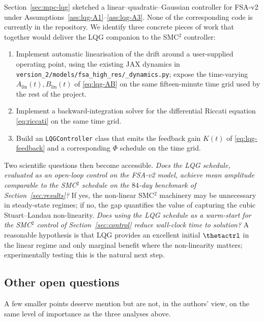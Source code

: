 Section~\ref{sec:mpc-lqg} sketched a linear--quadratic--Gaussian
controller for FSA-v2 under Assumptions~\ref{ass:lqg-A1}--\ref{ass:lqg-A3}.
None of the corresponding code is currently in the repository. We
identify three concrete pieces of work that together would deliver the
LQG companion to the SMC${}^2$ controller:
\begin{enumerate}
  \item Implement automatic linearisation of the drift around a
        user-supplied operating point, using the existing JAX dynamics in
        \texttt{version\_2/models/fsa\_high\_res/\_dynamics.py}; expose
        the time-varying $A_{\mathrm{lin}}(t),B_{\mathrm{lin}}(t)$ of
        \eqref{eq:lqg-AB} on the same fifteen-minute time grid used by
        the rest of the project.
  \item Implement a backward-integration solver for the differential
        Riccati equation \eqref{eq:riccati} on the same time grid.
  \item Build an \texttt{LQGController} class that emits the feedback
        gain $K(t)$ of \eqref{eq:lqg-feedback} and a corresponding
        $\Phi$ schedule on the time grid.
\end{enumerate}
Two scientific questions then become accessible. \emph{Does the LQG
schedule, evaluated as an open-loop control on the FSA-v2 model, achieve
mean amplitude comparable to the SMC${}^2$ schedule on the $84$-day
benchmark of Section~\ref{sec:results}?} If yes, the non-linear
SMC${}^2$ machinery may be unnecessary in steady-state regimes; if no,
the gap quantifies the value of capturing the cubic Stuart--Landau
non-linearity. \emph{Does using the LQG schedule as a warm-start for the
SMC${}^2$ control of Section~\ref{sec:control} reduce wall-clock time to
solution?} A reasonable hypothesis is that LQG provides an excellent
initial $\thetactrl$ in the linear regime and only marginal benefit
where the non-linearity matters; experimentally testing this is the
natural next step.

\subsection{Other open questions}\label{sec:discussion-other}

A few smaller points deserve mention but are not, in the authors' view,
on the same level of importance as the three analyses above.

